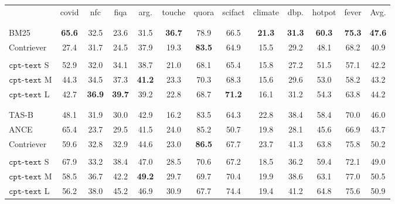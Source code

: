 \documentclass[nohyperref]{article}
\begin{document}
\begin{table*}[]
\centering
\setlength{\tabcolsep}{5pt}
\setlength\tabcolsep{2.8pt} \begin{tabular}{lcccccccccccc}
& covid & nfc & fiqa & arg. & touche & quora & scifact & climate & dbp. & hotpot & fever & Avg. \\ 
\Xhline{2.5\arrayrulewidth}
\multicolumn{13}{c}{Unsupervised} \\ 
\Xhline{1\arrayrulewidth} \\[-1.5ex]
BM25 \cite{bm25} & \textbf{65.6} &	32.5 &	23.6 &	31.5 &	\textbf{36.7} &	78.9 &	66.5 &	\textbf{21.3} &	\textbf{31.3} &	\textbf{60.3} &	\textbf{75.3} &	\textbf{47.6} \\
Contriever \cite{contreiver} & 27.4 &	31.7 &	24.5 &	37.9 &	19.3 &	\textbf{83.5} &	64.9 &	15.5 &	29.2 &	48.1 &	68.2 &	40.9 \\  
\Xhline{1\arrayrulewidth} & \\[-1.5ex]
$\texttt{cpt-text}$ S & 52.9 & 32.0 & 34.1 &	38.7 &	21.0 &	68.1 &	65.4 &	15.8 &	27.2 &	51.5 &	57.1 &	42.2 \\
 $\texttt{cpt-text}$ M & 44.3 & 34.5 &	37.3 &	\textbf{41.2} &	23.3 &	70.3 &	68.3 &	15.6 &	29.6 &	53.0 &	58.2 &	43.2 \\
$\texttt{cpt-text}$ L & 42.7 &	\textbf{36.9} &	\textbf{39.7} &	39.2 &	22.8 &	68.7 &	\textbf{71.2} &	16.1 &	31.2 &	54.3 &	63.8 &	44.2 \\
\Xhline{2.5\arrayrulewidth}
\multicolumn{13}{c}{Transfer from MSMARCO} \\
\Xhline{1\arrayrulewidth} \\[-1.5ex]
TAS-B \cite{tas} & 48.1 &	31.9 &	30.0 &	42.9 &	16.2 &	83.5 &	64.3 &	22.8 &	38.4 &	58.4 &	70.0 &	46.0 \\
ANCE \cite{Xiong} & 65.4 &	23.7 &	29.5 &	41.5 &	24.0 &	85.2 &	50.7 &	19.8 &	28.1 &	45.6 &	66.9 &	43.7 \\
Contriever \cite{contreiver}  & 59.6 &	32.8 &	32.9 &	44.6 &	23.0 &	\textbf{86.5} &	67.7 &	23.7 &	41.3 &	63.8 &	75.8 &	50.2 \\ 
\Xhline{1\arrayrulewidth} \\[-1.5ex]
$\texttt{cpt-text}$ S & 67.9 &	33.2 &	38.4 &	47.0 &	28.5 &	70.6 &	67.2 &	18.5 &	36.2 &	59.4 &	72.1 & 49.0 \\
$\texttt{cpt-text}$ M & 58.5 &	36.7 &	42.2 &	\textbf{49.2} &	29.7 &	69.7 &	70.4 &	19.9 &	38.6 &	63.1 &	77.0 &	50.5    \\
$\texttt{cpt-text}$ L & 56.2 &	38.0 &	45.2 &	46.9 &	30.9 &	67.7 &	74.4 &	19.4 &	41.2 &	64.8 &	75.6 &	50.9    \\

\end{tabular}
\end{table*}
\end{document}
